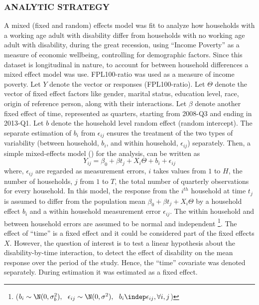 \documentclass[11pt]{extarticle} %
\begin{document}
\subsubsection*{ANALYTIC STRATEGY}
A mixed (fixed and random) effects model was fit to analyze how households with a working age adult with disability differ from households with no working age adult with disability, during the great recession, using “Income Poverty” as a measure of economic wellbeing, controlling for demographic factors. Since this dataset is longitudinal in nature, to account for between household differences a mixed effect model was use. FPL100-ratio was used as a measure of income poverty. Let $Y$ denote the vector or responses (FPL100-ratio). Let $\Theta$ denote the vector of fixed effect factors like gender, marital status, education level, race, origin of reference person, along with their interactions. Let $\beta$ denote another fixed effect of time, represented as quarters, starting from 2008-Q3 and ending in 2013-Q1. Let $b$ denote the household level random effect (random intercept). The separate estimation of $b_i$ from $\epsilon_{ij}$ ensures the treatment of the two types of variability (between household, $b_i$, and within household, $\epsilon_{ij}$) separately. Then, a simple mixed-effects model (\cite{Fitzmaurice_2012_Applied}) for the analysis, can be written as
\vspace{-0.5cm}
\begin{equation}
Y_{ij} = \beta_0 + \beta t_j + X_i\Theta + b_i + \epsilon_{ij}
\label{eq:MixedEffects1}
\end{equation}
where, $\epsilon_{ij}$ are regarded as measurement errors, $i$ takes values from $1$ to $H$, the number of households, $j$ from $1$ to $T$, the total number of quarterly observations for every household. In this model, the response from the $i^{th}$ household at time $t_j$ is assumed to differ from the population mean $\beta_0 + \beta t_j + X_i\Theta$ by a household effect $b_i$ and a within household measurement error $\epsilon_{ij}$. The within household and between household errors are assumed to be normal and independent \footnote{($b_i \sim \N(0, \sigma^2_b),\ \ \epsilon_{ij} \sim \N(0, \sigma^2), \ \ b_i \indep \epsilon_{ij}, \forall i, j$)}. The effect of ``time'' is a fixed effect and it could be considered part of the fixed effects $X$. However, the question of interest is to test a linear hypothesis about the disability-by-time interaction, to detect the effect of disability on the mean response over the period of the study. Hence, the ``time'' covariate was denoted separately. During estimation it was estimated as a fixed effect. 
\end{document}
